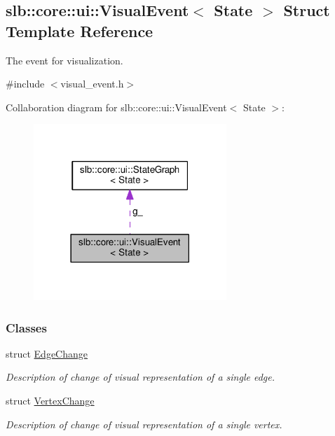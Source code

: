 \hypertarget{structslb_1_1core_1_1ui_1_1VisualEvent}{}\subsection{slb\+:\+:core\+:\+:ui\+:\+:Visual\+Event$<$ State $>$ Struct Template Reference}
\label{structslb_1_1core_1_1ui_1_1VisualEvent}


The event for visualization.  




{\ttfamily \#include $<$visual\+\_\+event.\+h$>$}



Collaboration diagram for slb\+:\+:core\+:\+:ui\+:\+:Visual\+Event$<$ State $>$\+:\nopagebreak
\begin{figure}[H]
\begin{center}
\leavevmode
\includegraphics[width=206pt]{structslb_1_1core_1_1ui_1_1VisualEvent__coll__graph}
\end{center}
\end{figure}
\subsubsection*{Classes}
\begin{DoxyCompactItemize}
\item 
struct \hyperlink{structslb_1_1core_1_1ui_1_1VisualEvent_1_1EdgeChange}{Edge\+Change}
\begin{DoxyCompactList}\small\item\em Description of change of visual representation of a single edge. \end{DoxyCompactList}\item 
struct \hyperlink{structslb_1_1core_1_1ui_1_1VisualEvent_1_1VertexChange}{Vertex\+Change}
\begin{DoxyCompactList}\small\item\em Description of change of visual representation of a single vertex. \end{DoxyCompactList}\end{DoxyCompactItemize}
